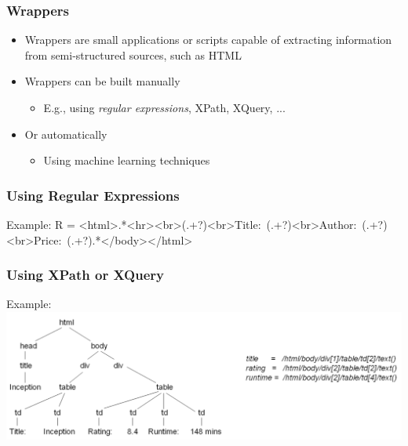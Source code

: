\documentclass[svgnames]{beamer}
\begin{document}
\begin{frame} \frametitle{Wrappers}
  
  \begin{itemize}
  \item Wrappers are small applications or scripts capable of extracting
    information from semi-structured sources, such as HTML
  \item Wrappers can be built manually
    \begin{itemize}
    \item E.g., using \emph{regular expressions}, XPath, XQuery, ...
    \end{itemize}
  \item Or automatically
    \begin{itemize}
    \item Using machine learning techniques
    \end{itemize}
  \end{itemize}

\end{frame}


\begin{frame} \frametitle{Using Regular Expressions}
  
  \begin{exampleblock}{Example:}
      \small\ttfamily
      R = <html>.*<hr><br>(.+?)<br>Title:~(.+?)<br>Author:~(.+?)
      \phantom{R = }<br>Price:~(.+?).*</body></html>
  \end{exampleblock}

\end{frame}


\begin{frame} \frametitle{Using XPath or XQuery}

    \begin{exampleblock}{Example:}
        \centering
        \includegraphics[width=\linewidth]{xpath_web_data}
    \end{exampleblock}
  
\end{frame}
\end{document}
